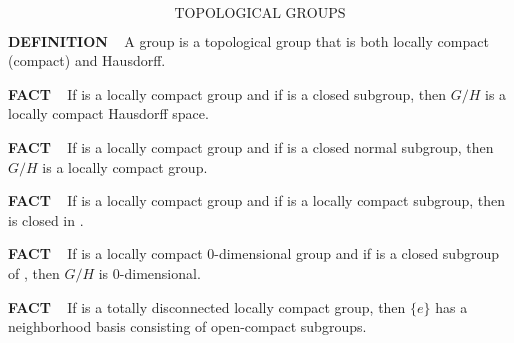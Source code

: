 \vspace{0.1cm}






\newpage
\setcounter{theoremn}{0}


\ \indent 

\[
\text{TOPOLOGICAL GROUPS}
\]
\begin{x}{\small\bf DEFINITION} \ %
A 
 group 
is a topological group \mG that is both locally compact (compact) and Hausdorff.
\end{x}

\vspace{0.1cm}


\begin{x}{\small\bf FACT} \ %
If \mG is a locally compact group and if \mH is a closed subgroup, then $G/H$ is a locally compact Hausdorff space.
\end{x}

\vspace{0.1cm}

\begin{x}{\small\bf FACT} \ %
If \mG is a locally compact group and if \mH is a closed normal subgroup, then $G/H$ is a locally compact group.
\end{x}

\vspace{0.1cm}

\begin{x}{\small\bf FACT} \ %
If \mG is a locally compact group and if \mH is a locally compact subgroup, then \mH is closed in \mG.
\end{x}

\vspace{0.1cm}

\begin{x}{\small\bf FACT} \ %
If \mG is a locally compact 0-dimensional group and if \mH is a closed subgroup of \mG, then $G/H$ is 0-dimensional.
\end{x}

\vspace{0.1cm}

\begin{x}{\small\bf FACT} \ %
If \mG is a totally disconnected locally compact group, then $\{e\}$ has a neighborhood basis consisting of open-compact subgroups.
\end{x}

